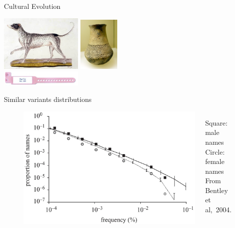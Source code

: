 \documentclass[12pt, handout=show,notes=show]{beamer}
\begin{document}
\begin{frame}{Cultural Evolution}
	\begin{center}
		\includegraphics[width=4cm]{images/dalmatian.jpg} \hspace{2cm}
		\includegraphics[width=2cm]{images/pottery.jpg}\\
		\vspace{1cm}
		\includegraphics[width=4cm]{images/name.jpg}
	\end{center}
	Similar variants distributions
	\begin{figure}
		\begin{columns}
			\begin{column}{.8\textwidth}
				\centering
				\includegraphics[width=.6\textwidth]{images/powerlawrepartition.jpg}
			\end{column}
			\begin{column}{.3\textwidth}
				\tiny
				Square: male names\\
				Circle: female names\\
			From Bentley et al,~2004.
			\end{column}
		\end{columns}
	\end{figure}
\end{frame}
\end{document}
